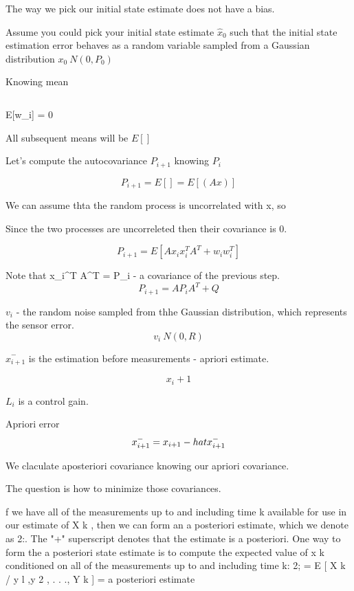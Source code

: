 The way we pick our initial state estimate does not have a bias.

Assume you could pick your initial state estimate $\hat x_0$ such that
the initial state estimation error behaves as a random 
variable sampled from a Gaussian distribution $x_0 ~ N(0, P_0)$

Knowing mean 

\[\]

E[w_i] = 0

All subsequent means will be $E[]$



Let's compute the autocovariance $P_{i+1}$ knowing $P_i$ 

\[P_{i+1} = E[] = E[(Ax)]\]


We can assume thta the random process is uncorrelated with x, so 

Since the two processes are uncorreleted then their covariance is 0.  

\[P_{i+1} = E[A x_i x_i^T A^T + w_i w_i^T] \]

Note that x_i^T A^T = P_i - a covariance of the previous step. 
\[P_{i+1} = A P_i A^T + Q\]


$v_i$ - the random noise sampled from thhe Gaussian distribution, which represents the sensor error. 
\[v_i ~ N(0, R)\]


$\hat x_{i+1}^-$ is the estimation before measurements - apriori estimate.

\[x_i+1 \]

$L_i$ is a control gain. 



Apriori error \[x_{i+1}^- = x_{i+1} - \\hat x_{i+1}^-\]


We claculate aposteriori covariance knowing our apriori covariance.


The question is how to minimize those covariances.





f we have all of the measurements
up to and including time k available for use in our estimate of X k , then we can form
an a posteriori estimate, which we denote as 2:. The "+" superscript denotes that
the estimate is a posteriori. One way to form the a posteriori state estimate is to
compute the expected value of x k conditioned on all of the measurements up to
and including time k:
2; = E [ X k / y l ,y 2 , . . ., Y k ] = a posteriori estimate




